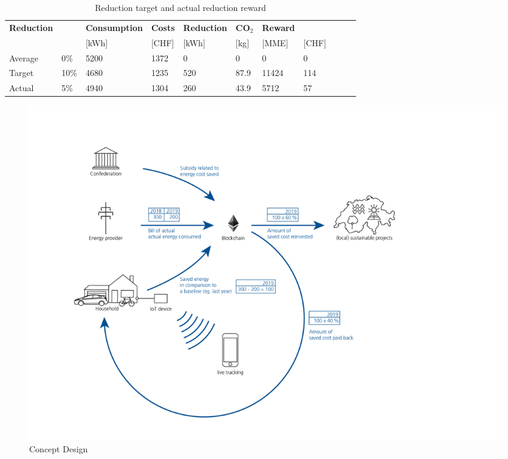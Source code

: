 \documentclass[11pt]{article}
\begin{document}
\begin{table}[ht]
\begin{tabular}{ll|llllll|lll}
\textbf{Reduction} & \textbf{} & \textbf{Consumption} & \textbf{Costs} & \textbf{Reduction} & \textbf{CO$_2$} & \textbf{Reward} &           \\
                   &           & {[}kWh{]}            & {[}CHF{]}      & {[}kWh{]}          & {[}kg{]}     & {[}MME{]}       & {[}CHF{]} \\ \hline
Average             & 0\%      & 5200                 & 1372            & 0                & 0        & 0           & 0       \\
Target             & 10\%      & 4680                 & 1235            & 520                & 87.9         & 11424           & 114       \\
Actual             & 5\%       & 4940                 & 1304            & 260                & 43.9          & 5712            & 57
\end{tabular}
\caption{Reduction target and actual reduction reward}
\label{table_target-actual}
\end{table}

\begin{figure}[ht]
	\begin{center}
		\includegraphics[scale=1.7]{../presentation/concept.png}
		\caption{Concept Design}
		\label{img_concept}
	\end{center}
\end{figure}
\end{document}
